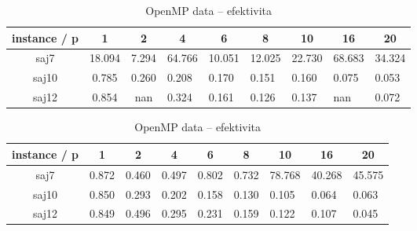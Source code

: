 \documentclass{article}
\begin{document}
    \begin{table}[ht!]
        \begin{subtable}{.5\linewidth}\centering
        \begin{tabular}{|c|c|c|l|l|l|l|l|l|}
            \hline
            \textbf{instance / p} &
            \textbf{1} &
            \textbf{2} &
            \multicolumn{1}{c|}{\textbf{4}} &
            \multicolumn{1}{c|}{\textbf{6}} &
            \multicolumn{1}{c|}{\textbf{8}} &
            \multicolumn{1}{c|}{\textbf{10}} &
            \multicolumn{1}{c|}{\textbf{16}} &
            \multicolumn{1}{c|}{\textbf{20}} \\ \hline
            saj7 &
                {\color[HTML]{FE0000} 18.094} &
                {\color[HTML]{FE0000} 7.294} &
                {\color[HTML]{FE0000} 64.766} &
                {\color[HTML]{FE0000} 10.051} &
                {\color[HTML]{FE0000} 12.025} &
                {\color[HTML]{FE0000} 22.730} &
                {\color[HTML]{FE0000} 68.683} &
                {\color[HTML]{FE0000} 34.324} \\ \hline
            saj10 & 0.785 & 0.260 & 0.208 & 0.170 & 0.151 & 0.160 & 0.075 & 0.053 \\ \hline
            saj12 & 0.854 & nan   & 0.324 & 0.161 & 0.126 & 0.137 & nan   & 0.072 \\ \hline
        \end{tabular}
        \caption{OpenMP task -- efektivita}
        \label{tab:efektivita-openmp-task}
        \end{subtable}%
        \bigskip
        \bigskip

        \begin{subtable}{.5\linewidth}\centering
        \begin{tabular}{|c|c|c|l|l|l|l|l|l|}
            \hline
            \textbf{instance / p} &
            \textbf{1} &
            \textbf{2} &
            \multicolumn{1}{c|}{\textbf{4}} &
            \multicolumn{1}{c|}{\textbf{6}} &
            \multicolumn{1}{c|}{\textbf{8}} &
            \multicolumn{1}{c|}{\textbf{10}} &
            \multicolumn{1}{c|}{\textbf{16}} &
            \multicolumn{1}{c|}{\textbf{20}} \\ \hline
            saj7  & 0.872 & 0.460 & 0.497 & 0.802 & 0.732 & {\color[HTML]{FE0000} 78.768} & {\color[HTML]{FE0000} 40.268} & {\color[HTML]{FE0000} 45.575} \\ \hline
            saj10 & 0.850 & 0.293 & 0.202 & 0.158 & 0.130 & 0.105                         & 0.064                         & 0.063                         \\ \hline
            saj12 & 0.849 & 0.496 & 0.295 & 0.231 & 0.159 & 0.122                         & 0.107                         & 0.045                         \\ \hline
        \end{tabular}
        \caption{OpenMP data -- efektivita}
        \label{tab:efektivita-openmp-data}
        \end{subtable}%
        \bigskip
        \bigskip


\end{table}
\end{document}
